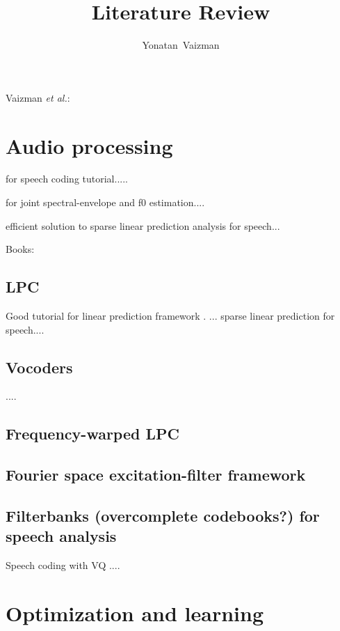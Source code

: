 \documentclass[journal]{IEEEtran}
\begin{document}
%
\title{Literature Review}
\author{Yonatan~Vaizman}

\markboth{}%
{Vaizman \MakeLowercase{\textit{et al.}}: }

\maketitle



\section{Audio processing}

\cite{spanias1994speechCoding} for speech coding tutorial.....

\cite{kameoka2010speech} for joint spectral-envelope and f0 estimation....

\cite{khanagha2013efficient} efficient solution to sparse linear prediction analysis for speech...

Books: \cite{rabiner1978digital,chu2004speechCoding,kleijn1995speech,Rabiner93}

\subsection{LPC}
Good tutorial for linear prediction framework \cite{makhoul1975linearPredictionTutorial}.
\cite{makhoul1977stableLattice,makhoul1985VQ}...
\cite{giacobello2008sparse,giacobello2012sparse} sparse linear prediction for speech....
\subsection{Vocoders}
\cite{makhoul1976vocoderSpeechQuality}....
\subsection{Frequency-warped LPC}
\subsection{Fourier space excitation-filter framework}
\subsection{Filterbanks (overcomplete codebooks?) for speech analysis}
Speech coding with VQ \cite{makhoul1985VQ}....

\section{Optimization and learning}
\end{document}
